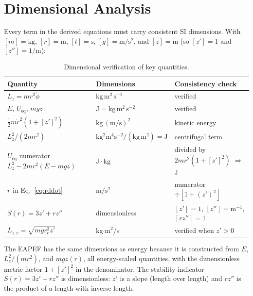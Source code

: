 \documentclass[11pt,letterpaper]{article}
\begin{document}
\section{Dimensional Analysis}
\label{sec:dimensional}

Every term in the derived equations must carry consistent SI dimensions. With $[m]=\mathrm{kg}$, $[r]=\mathrm{m}$, $[t]=\mathrm{s}$, $[g]=\mathrm{m/s^2}$, and $[z]=\mathrm{m}$ (so $[z']=1$ and $[z'']=1/\mathrm{m}$):

\begin{table}[htbp]
    \centering
    \caption{Dimensional verification of key quantities.}
    \label{tab:dimensional}
    \begin{tabular}{lll}
        \toprule
        Quantity & Dimensions & Consistency check \\
        \midrule
        $L_z = mr^2\dot{\phi}$ & $\mathrm{kg\,m^{2}\,s^{-1}}$ & verified \\
        $E$, $U_{\mathrm{eq}}$, $mgz$ & $\mathrm{J = kg\,m^{2}\,s^{-2}}$ & verified \\
        $\tfrac{1}{2}m\dot{r}^2(1+[z']^2)$ & $\mathrm{kg\,(m/s)^{2}}$ & kinetic energy \\
        $L_z^2/(2mr^2)$ & $\mathrm{kg^{2}m^{4}s^{-2}/(kg\,m^{2}) = J}$ & centrifugal term \\
        $U_{\mathrm{eq}}$ numerator $L_z^2-2mr^2(E-mgz)$ & $\mathrm{J\cdot kg}$ & divided by $2mr^2(1+[z']^2)$ $\Rightarrow$ J \\
        $\ddot{r}$ in Eq.~\eqref{eq:rddot} & $\mathrm{m/s^{2}}$ & numerator $\div [1+(z')^2]$ \\
        $S(r)=3z'+rz''$ & dimensionless & $[z']=1$, $[z'']= \mathrm{m^{-1}}$, $[rz'']=1$ \\
        $L_{z,c}=\sqrt{mgr_c^3 z'}$ & kg$\cdot$m$^2$/s & verified when $z'>0$ \\
        \bottomrule
    \end{tabular}
\end{table}

The EAPEF has the same dimensions as energy because it is constructed from $E$, $L_z^2/(mr^2)$, and $mgz(r)$, all energy-scaled quantities, with the dimensionless metric factor $1+[z']^2$ in the denominator. The stability indicator $S(r)=3z'+rz''$ is dimensionless: $z'$ is a slope (length over length) and $rz''$ is the product of a length with inverse length.
\end{document}
